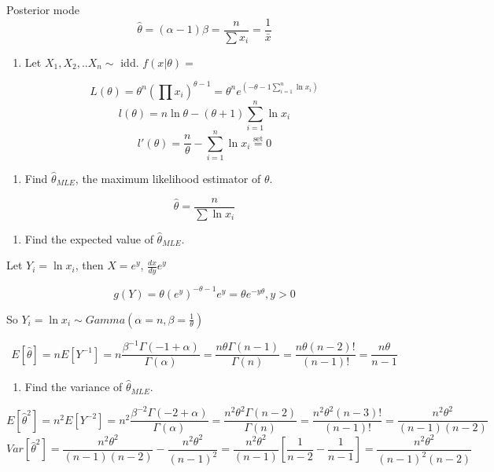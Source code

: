 \documentclass[]{article}
\providecommand{\tightlist}{%
  \setlength{\itemsep}{0pt}\setlength{\parskip}{0pt}}
\begin{document}
Posterior mode
\[\hat\theta=(\alpha-1)\beta=\frac{n}{\sum x_i}=\frac{1}{\bar x}\]

\begin{enumerate}
\def\labelenumi{\arabic{enumi}.}
\setcounter{enumi}{4}
\tightlist
\item
  \textcolor[rgb]{0.5,0.5,0.5}{Let $X_1,X_2,..X_n\sim$ idd. $f(x|\theta)=$}
\end{enumerate}

\[L(\theta)=\theta^n(\prod x_i)^{\theta-1}=\theta^n e^{(-\theta-1\sum^n_{i=1} \ln x_i)}\]
\[l(\theta)=n\ln\theta-(\theta+1)\sum^n_{i=1} \ln x_i\]
\[l'(\theta)=\frac{n}\theta-\sum^n_{i=1} \ln x_i\overset{\text{set}}{=}0\]

\begin{enumerate}
\def\labelenumi{\alph{enumi}.}
\tightlist
\item
  \textcolor[rgb]{0.5,0.5,0.5}{Find $\hat\theta_{MLE}$, the maximum likelihood estimator of $\theta$.}
\end{enumerate}

\[\hat\theta=\frac{n}{\sum\ln x_i}\]

\begin{enumerate}
\def\labelenumi{\alph{enumi}.}
\setcounter{enumi}{1}
\tightlist
\item
  \textcolor[rgb]{0.5,0.5,0.5}{Find the expected value of $\hat\theta_{MLE}$.}
\end{enumerate}

Let \(Y_i=\ln x_i\), then \(X=e^y\), \(\frac{dx}{dy}e^y\)

\[g(Y)=\theta(e^y)^{-\theta-1}e^y=\theta e^{-y\theta}, y>0\]

So \(Y_i=\ln x_i\sim Gamma(\alpha=n,\beta=\frac1{\theta})\)

\[E[\hat\theta]=nE[Y^{-1}]=n\frac{\beta^{-1}\Gamma(-1+\alpha)}{\Gamma(\alpha)}=\frac{n\theta\Gamma(n-1)}{\Gamma(n)}=\frac{n\theta(n-2)!}{(n-1)!}=\frac{n\theta}{n-1}\]

\begin{enumerate}
\def\labelenumi{\alph{enumi}.}
\setcounter{enumi}{2}
\tightlist
\item
  \textcolor[rgb]{0.5,0.5,0.5}{Find the variance of $\hat\theta_{MLE}$.}
\end{enumerate}

\[E[\hat\theta^2]=n^2E[Y^{-2}]=n^2\frac{\beta^{-2}\Gamma(-2+\alpha)}{\Gamma(\alpha)}=\frac{n^2\theta^2\Gamma(n-2)}{\Gamma(n)}=\frac{n^2\theta^2(n-3)!}{(n-1)!}=\frac{n^2\theta^2}{(n-1)(n-2)}\]
\[Var[\hat\theta^2]=\frac{n^2\theta^2}{(n-1)(n-2)}-\frac{n^2\theta^2}{(n-1)^2}=\frac{n^2\theta^2}{(n-1)}[\frac1{n-2}-\frac1{n-1}]=\frac{n^2\theta^2}{(n-1)^2(n-2)}\]
\end{document}
